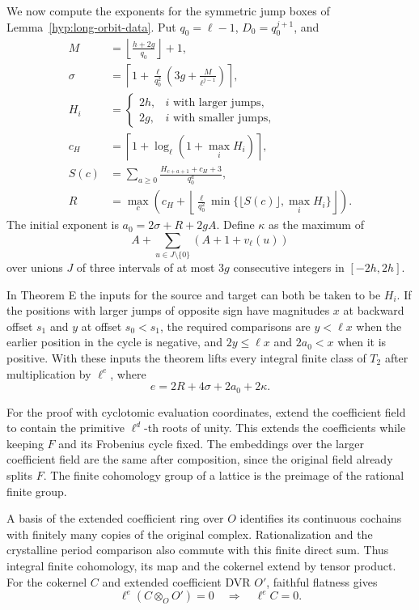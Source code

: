 We now compute the exponents for the symmetric jump boxes of
Lemma~\ref{hyp:long-orbit-data}.
Put \(q_0=\ell-1\), \(D_0=q_0^{j+1}\), and
\[
 \begin{split}
 M&=\left\lfloor\frac{h+2g}{q_0}\right\rfloor+1,\\
 \sigma&=\left\lceil 1+\frac{\ell}{q_0^2}
                      \left(3g+\frac{M}{\ell^{j-1}}\right)\right\rceil,\\
 H_i&=\begin{cases}2h,&i\text{ with larger jumps},\\2g,&i\text{ with smaller jumps},\end{cases}\\
 c_H&=\left\lceil 1+\log_\ell(1+\max_i H_i)\right\rceil,\\
 S(c)&=\sum_{a\ge0}\frac{H_{c+a+1}+c_H+3}{q_0^a},\\
 R&=\max_c\left(c_H+\left\lfloor\frac{\ell}{q_0^2}
           \min\{\lfloor S(c)\rfloor,\max_i H_i\}\right\rfloor\right).
 \end{split}
\]
The initial exponent is \(a_0=2\sigma+R+2gA\). Define \(\kappa\)
as the maximum of
\[
       A+\sum_{u\in J\setminus\{0\}}(A+1+v_\ell(u))
\]
over unions \(J\) of three intervals of at most \(3g\) consecutive
integers in \([-2h,2h]\).

In Theorem E the inputs for the source and
target can both be taken to be \(H_i\). If the positions with larger jumps of
opposite sign have magnitudes \(x\) at backward offset \(s_1\) and
\(y\) at offset \(s_0<s_1\), the required comparisons are
\(y<\ell x\) when the earlier position in the cycle is negative,
and \(2y\le\ell x\) and \(2a_0<x\) when it is positive. With these
inputs the theorem lifts every integral finite class of \(T_2\) after
multiplication by \(\ell^e\), where
\begin{equation}\label{eq:long-orbit-exponent}
                 e=2R+4\sigma+2a_0+2\kappa.
\end{equation}

For the proof with cyclotomic evaluation coordinates, extend the
coefficient field to contain the primitive \(\ell^d\)-th roots of
unity. This extends the coefficients while keeping \(F\) and its
Frobenius cycle fixed. The embeddings over the larger coefficient
field are the same after composition, since the original field
already splits \(F\). The finite cohomology group of a lattice
is the preimage of the rational finite group.

A basis of the
extended coefficient ring over \(O\) identifies its continuous
cochains with finitely many copies of the original complex.
Rationalization and the crystalline period comparison also commute
with this finite direct sum. Thus integral finite cohomology, its
map and the cokernel extend by tensor product. For the cokernel \(C\) and extended coefficient DVR \(O'\), faithful flatness gives
\[
 \ell^e(C\otimes_O O')=0\quad\Longrightarrow\quad\ell^e C=0.
\]


